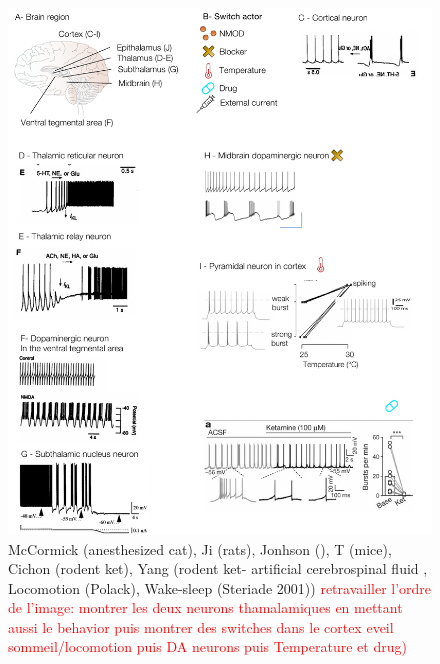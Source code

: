 \begin{figure}
    \centering
    \includegraphics{latex/fig/Intro/Bgd_Switch.pdf}
    \caption{\citep{mccormick_sleep_1997, ji_tuning_2009, johnson_burst_1992, hedrick_effect_2012} McCormick (anesthesized cat), Ji (rats), Jonhson (), T (mice), Cichon (rodent ket), Yang (rodent ket- artificial cerebrospinal fluid , Locomotion (Polack), Wake-sleep (Steriade 2001)) \textcolor{red}{retravailler l'ordre de l'image: montrer les deux neurons thamalamiques en mettant aussi le behavior puis montrer des switches dans le cortex eveil sommeil/locomotion puis DA neurons puis Temperature et drug)}}
    \label{fig:intro_switch}
\end{figure}

